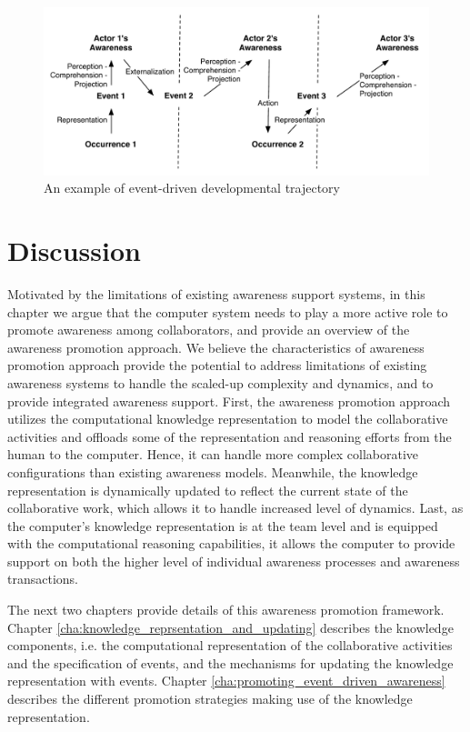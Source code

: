 \begin{figure}[htbp] %
   \centering
   \includegraphics[width=4.5in]{example_awareness_traj.pdf} 
   \caption{An example of event-driven developmental trajectory}
   \label{fig:example_awareness_traj}
\end{figure}

\section{Discussion} %
\label{sec:discussion}
Motivated by the limitations of existing awareness support systems, in this chapter we argue that the computer system needs to play a more active role to promote awareness among collaborators, and provide an overview of the awareness promotion approach. We believe the characteristics of awareness promotion approach provide the potential to address limitations of existing awareness systems to handle the scaled-up complexity and dynamics, and to provide integrated awareness support. First, the awareness promotion approach utilizes the computational knowledge representation to model the collaborative activities and offloads some of the representation and reasoning efforts from the human to the computer. Hence, it can  handle more complex collaborative configurations than existing awareness models. Meanwhile, the knowledge representation is dynamically updated to reflect the current state of the collaborative work, which allows it to handle increased level of dynamics. Last, as the computer's knowledge representation is at the team level and is equipped with the computational reasoning capabilities, it allows the computer to provide support on both the higher level of individual awareness processes and awareness transactions.

The next two chapters provide details of this awareness promotion framework. Chapter \ref{cha:knowledge_reprsentation_and_updating} describes the knowledge components, i.e. the computational representation of the collaborative activities and the specification of events, and the mechanisms for updating the knowledge representation with events. Chapter \ref{cha:promoting_event_driven_awareness} describes the different promotion strategies making use of the knowledge representation.




 

